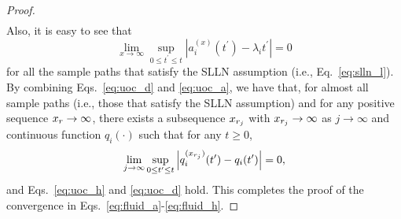 \documentclass[10pt,journal,compsoc]{IEEEtran}
\begin{document}
\begin{proof}
\begin{eqnarray}
\end{eqnarray}
Also, it is easy to see that 
\begin{equation}
\label{eq:uoc_a}
\lim_{x \rightarrow \infty} \sup_{0 \le t^{\prime} \le t} \left | a_i^{(x)}(t^{\prime}) - \lambda_i t^{\prime} \right | = 0 
\end{equation}
for all the sample paths that satisfy the SLLN assumption (i.e., Eq.~\eqref{eq:slln_l}).
By combining Eqs.~\eqref{eq:uoc_d} and \eqref{eq:uoc_a}, we have that, for almost all sample 
paths (i.e., those that satisfy the SLLN assumption) and for any positive sequence ${x_r} \rightarrow \infty$, 
there exists a subsequence ${x_{r_j}}$ with ${x_{r_j}} \rightarrow \infty$ as $j \rightarrow \infty$
and continuous function $q_i(\cdot)$ such that for any $t \ge 0$, 
\[
\lim_{j \rightarrow \infty} \sup_{0 \le t^{\prime} \le t} \left | q_i^{({x_{r_j}})}(t^{\prime}) - q_i(t^{\prime}) \right | = 0,
\]
and Eqs.~\eqref{eq:uoc_h} and \eqref{eq:uoc_d} hold.
This completes the proof of the convergence in Eqs.~\eqref{eq:fluid_a}-\eqref{eq:fluid_h}.
\end{proof}
\end{document}
